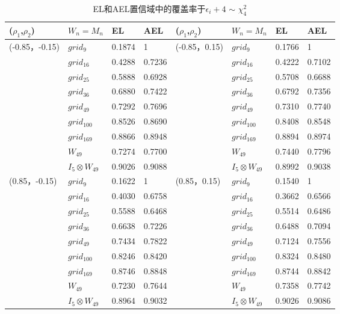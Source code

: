 \documentclass[a4paper,c5size,onecolumn,twoside,cap,Chinese]{APSart}
\begin{document}

\begin{table}[htbp]
\setlength{\abovecaptionskip}{0cm}
\centering
\caption{EL和AEL置信域中的覆盖率于$\epsilon_{i}+4$ $\sim$ $\chi^2_4$\label{table:3}}
\begin{tabular*}{\hsize}{@{}@{\extracolsep{\fill}}llllllll@{}}
\hline
($\rho_{1}$,$\rho_{2}$)&$W_n=M_n$ & EL&AEL&($\rho_{1}$,$\rho_{2}$)&$W_n=M_n$ & EL&AEL\\
\hline
(-0.85，-0.15)& $grid_{9}$  	& 0.1874 & 1           &  (-0.85，0.15)	& $grid_{9}$ & 0.1766 & 1   \\
		& $grid_{16}$   	& 0.4288 & 0.7236 	&                 		& $grid_{16}$  & 0.4222 & 0.7102 \\
		& $grid_{25}$   	& 0.5888 & 0.6928 	&                 		& $grid_{25}$  & 0.5708 & 0.6688 \\
		& $grid_{36}$   	& 0.6880 & 0.7422 	&                	 	& $grid_{36}$  & 0.6792 & 0.7356\\
		& $grid_{49}$   	& 0.7292 & 0.7696	&                 		& $grid_{49}$  & 0.7310 & 0.7740\\
                      & $grid_{100}$ 	& 0.8526 & 0.8690 	&                 		& $grid_{100}$ & 0.8408 & 0.8548\\
                      & $grid_{169}$ 	& 0.8866 & 0.8948 	&                 		& $grid_{169}$ & 0.8894 & 0.8974 \\
                      & $W_{49}$ 	&  0.7274 & 0.7700&                 		&  $W_{49}$ & 0.7440 & 0.7796 \\
                      & $I_{5}\otimes W_{49}$& 0.9026 &0.9088   	&     &$I_{5}\otimes W_{49}$&0.8992 &0.9038   \\
\hline
(0.85，-0.15) & $grid_{9}$   	& 0.1622 & 1           &  (0.85，0.15)	& $grid_{9}$  & 0.1540 & 1\\
		& $grid_{16}$   	& 0.4030 & 0.6758	&                 		& $grid_{16}$ & 0.3662 & 0.6566\\
		& $grid_{25}$   	& 0.5588 & 0.6468	&                 		& $grid_{25}$ & 0.5514 & 0.6486\\
		& $grid_{36}$   	& 0.6638 & 0.7226  &                 		& $grid_{36}$ & 0.6488 & 0.7094 \\
		& $grid_{49}$   	& 0.7434 & 0.7822  &                  		& $grid_{49}$ & 0.7124 & 0.7556\\
                      & $grid_{100}$ 	& 0.8246 & 0.8420  &                 		& $grid_{100}$ & 0.8324 & 0.8480\\
                      & $grid_{169}$ 	& 0.8746 & 0.8848  &                 		& $grid_{169}$ & 0.8744 & 0.8842  \\
                      & $W_{49}$ 	&  0.7230 & 0.7644&                 		&  $W_{49}$ &  0.7358 & 0.7742    \\
                      & $I_{5}\otimes W_{49}$& 0.8964 &0.9032	&     &$I_{5}\otimes W_{49}$&0.9026 &0.9086   \\
\hline
\end{tabular*}
\end{table}
\end{document}

